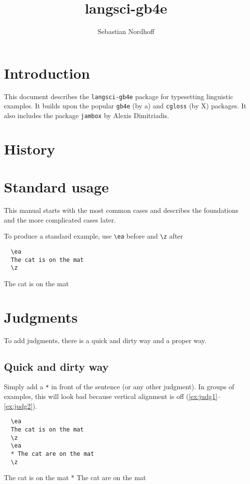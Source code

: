 \documentclass[output=paper]{langscibook}
\author{Sebastian Nordhoff}
\title{langsci-gb4e}
\newcommand{\cmd}[1]{\texttt{\textbackslash#1}}
\begin{document}
  \maketitle

\section{Introduction}
This document describes the \texttt{langsci-gb4e} package for typesetting linguistic examples. It builds upon the popular \texttt{gb4e} (by a) and \texttt{cgloss} (by X) packages. It also includes the package \texttt{jambox} by Alexis Dimitriadis. 
\section{History}
\section{Standard usage}
This manual starts with the most common cases and describes the foundations and the more complicated cases later. 

To produce a standard example, use \cmd{ea} before and \cmd{z} after
 
\begin{minipage}{.45\textwidth}
\begin{lstlisting}
  \ea 
  The cat is on the mat
  \z
\end{lstlisting}
\end{minipage}
\parbox[b]{.45\textwidth}{
  \ea 
  The cat is on the mat
  \z
  }

\section{Judgments}  
  To add judgments, there is a quick and dirty way and a proper way. 

\subsection{Quick and dirty way}  
Simply add a \texttt{*} in front of the sentence (or any other judgment). In groups of examples, this will look bad because vertical alignment is off (\ref{ex:judg1}--\ref{ex:judg2}).

\begin{minipage}{.45\textwidth}
\begin{lstlisting}
  \ea 
  The cat is on the mat
  \z
  \ea 
  * The cat are on the mat
  \z
\end{lstlisting}
\end{minipage}
\parbox[b]{.45\textwidth}{
  \ea\label{ex:judg1} 
  The cat is on the mat
  \z
  \ea\label{ex:judg2} 
  * The cat are on the mat
  \z
  }
  
\end{document}

